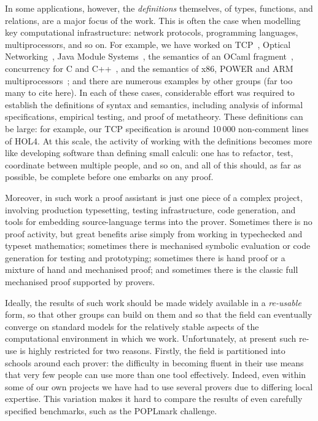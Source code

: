 \documentclass[a4paper]{llncs}
\begin{document}
In some applications, however, the \emph{definitions} themselves, of
types, functions, and relations, are a
major focus of the work.  This is often the case when modelling key
computational infrastructure: network protocols, programming languages,
multiprocessors, and so on.  For example, we have worked on
TCP~\cite{TCP:paper,RNS08}, Optical Networking~\cite{BDJRS06},
Java Module Systems~\cite{ljam}, the semantics of an OCaml
fragment~\cite{ocamllightesop}, concurrency for C and
C++~\cite{C++,ppdp11,Ctso}, and the semantics of x86, POWER and ARM
multiprocessors~\cite{pldi11,x86popl}; and there are numerous
examples by other groups (far too many to cite here).  In each of
these cases, considerable effort was required to establish the
definitions of syntax and semantics, including analysis of informal
specifications, empirical testing, and proof of metatheory.  
%
These definitions can be large: for example, our TCP specification is
around 10\,000 non-comment lines of HOL4.  At this scale, the activity
of working with the definitions becomes more like developing software than
defining small calculi: one has to refactor, test, coordinate between
multiple people, and so on, and all of this should, as far as
possible, be complete before one embarks on any proof.  


  Moreover, in such work a
proof assistant is just one piece of a complex project, involving
production typesetting, testing infrastructure, code generation, and
tools for embedding source-language terms into the prover.  Sometimes
there is no proof activity, but great benefits arise simply from working
in typechecked and typeset mathematics; sometimes there is mechanised
symbolic evaluation or code generation for testing and prototyping;
sometimes there is hand proof or a mixture of hand and mechanised proof;
and sometimes there is the classic full mechanised proof supported by
provers.

Ideally, the results of such work should be made widely available in a
\emph{re-usable} form, so that other groups can build on them and so
that the field can eventually converge on standard models for the
relatively stable aspects of the computational environment in which we
work.   
%
%
Unfortunately, at present such re-use is highly restricted for two
reasons.
Firstly, the field is partitioned into schools around each prover: the
difficulty in becoming fluent in their use means that very few people
can use more than one tool effectively.  Indeed, even within some of our
own projects we have had to use several provers due to differing local
expertise.  This variation makes it hard to compare the results of even
carefully specified benchmarks, such as the POPLmark
challenge.
\end{document}
